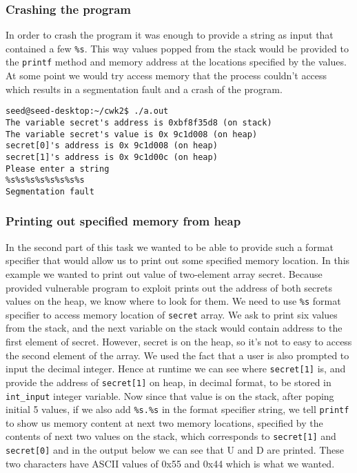 \documentclass[12pt, a4paper, pdflatex]{article}
\begin{document}
\subsubsection{Crashing the program}
In order to crash the program it was enough to provide a string as input that contained a few \texttt{\%s}. This way values popped from the stack would be provided to the \texttt{printf} method and memory address at the locations specified by the values. At some point we would try access memory that the process couldn't access which results in a segmentation fault and a crash of the program.

\vspace{1em}
\lstset{
	captionpos=b,
	frame=single,
	language=bash,
  breaklines=true,
	caption=Example of crashing the program,
	label=printf:crash
}
\begin{lstlisting}
seed@seed-desktop:~/cwk2$ ./a.out 
The variable secret's address is 0xbf8f35d8 (on stack)
The variable secret's value is 0x 9c1d008 (on heap)
secret[0]'s address is 0x 9c1d008 (on heap)
secret[1]'s address is 0x 9c1d00c (on heap)
Please enter a string
%s%s%s%s%s%s%s%s
Segmentation fault
\end{lstlisting}

\subsubsection{Printing out specified memory from heap}
In the second part of this task we wanted to be able to provide such a format specifier that would allow us to print out some specified memory location. In this example we wanted to print out value of two-element array secret. Because provided vulnerable program to exploit prints out the address of both secrets values on the heap, we know where to look for them. We need to use \texttt{\%s} format specifier to access memory location of 
\texttt{secret} array. We ask to print six values from the stack, and the next variable on the stack would contain address to the first element of secret. However, secret is on the heap, so it's not to easy to access the second element of the array. We used the fact that a user is also prompted to input the decimal integer. Hence at runtime we can see where \texttt{secret[1]} is, and provide the address of \texttt{secret[1]} on heap, in decimal format, to be stored in \texttt{int\_input} integer variable. Now since that value is on the stack, after poping initial 5 values, if we also add \texttt{\%s.\%s} in the format specifier string, we tell \texttt{printf} to show us memory content at next two memory locations, specified by the contents of next two values on the stack, which corresponds to \texttt{secret[1]} and \texttt{secret[0]} and in the output below we can see that U and D are printed. These two characters have ASCII values of 0x55 and 0x44 which is what we wanted.
\end{document}
